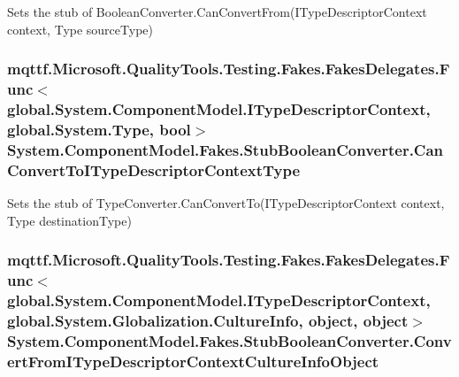 Sets the stub of Boolean\-Converter.\-Can\-Convert\-From(\-I\-Type\-Descriptor\-Context context, Type source\-Type)

\hypertarget{class_system_1_1_component_model_1_1_fakes_1_1_stub_boolean_converter_a0fbe1e8271f6dcbea8e4ae6013c54a2f}{
\subsubsection[{Can\-Convert\-To\-I\-Type\-Descriptor\-Context\-Type}]{\setlength{\rightskip}{0pt plus 5cm}mqttf.\-Microsoft.\-Quality\-Tools.\-Testing.\-Fakes.\-Fakes\-Delegates.\-Func$<$global.\-System.\-Component\-Model.\-I\-Type\-Descriptor\-Context, global.\-System.\-Type, bool$>$ System.\-Component\-Model.\-Fakes.\-Stub\-Boolean\-Converter.\-Can\-Convert\-To\-I\-Type\-Descriptor\-Context\-Type}}\label{class_system_1_1_component_model_1_1_fakes_1_1_stub_boolean_converter_a0fbe1e8271f6dcbea8e4ae6013c54a2f}


Sets the stub of Type\-Converter.\-Can\-Convert\-To(\-I\-Type\-Descriptor\-Context context, Type destination\-Type)

\hypertarget{class_system_1_1_component_model_1_1_fakes_1_1_stub_boolean_converter_a4aa398dc2f4adc9a67402ee70ca76719}{
\subsubsection[{Convert\-From\-I\-Type\-Descriptor\-Context\-Culture\-Info\-Object}]{\setlength{\rightskip}{0pt plus 5cm}mqttf.\-Microsoft.\-Quality\-Tools.\-Testing.\-Fakes.\-Fakes\-Delegates.\-Func$<$global.\-System.\-Component\-Model.\-I\-Type\-Descriptor\-Context, global.\-System.\-Globalization.\-Culture\-Info, object, object$>$ System.\-Component\-Model.\-Fakes.\-Stub\-Boolean\-Converter.\-Convert\-From\-I\-Type\-Descriptor\-Context\-Culture\-Info\-Object}}\label{class_system_1_1_component_model_1_1_fakes_1_1_stub_boolean_converter_a4aa398dc2f4adc9a67402ee70ca76719}


